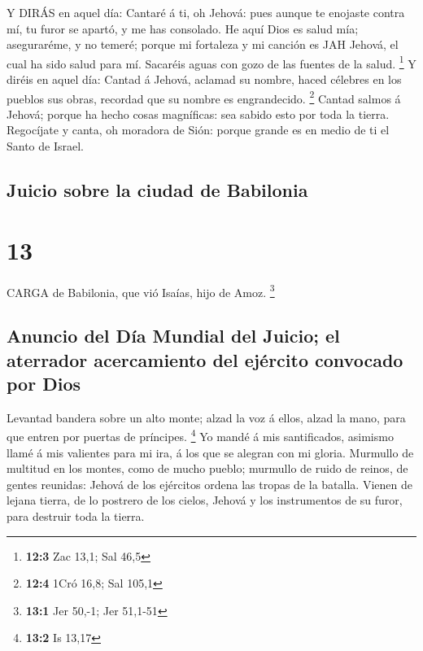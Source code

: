  Y DIRÁS en aquel día: Cantaré á ti, oh Jehová: pues aunque
te enojaste contra mí, tu furor se apartó, y me has consolado.
 He aquí Dios es salud mía; aseguraréme, y no temeré; porque
mi fortaleza y mi canción es JAH Jehová, el cual ha sido salud para mí.
 Sacaréis aguas con gozo de las fuentes de la salud.
\footnote{\textbf{12:3} Zac 13,1; Sal 46,5}  Y diréis en
aquel día: Cantad á Jehová, aclamad su nombre, haced célebres en los
pueblos sus obras, recordad que su nombre es engrandecido. \footnote{\textbf{12:4}
  1Cró 16,8; Sal 105,1}  Cantad salmos á Jehová; porque ha
hecho cosas magníficas: sea sabido esto por toda la tierra. 
Regocíjate y canta, oh moradora de Sión: porque grande es en medio de ti
el Santo de Israel.

\hypertarget{juicio-sobre-la-ciudad-de-babilonia}{%
\subsection{Juicio sobre la ciudad de
Babilonia}\label{juicio-sobre-la-ciudad-de-babilonia}}

\hypertarget{section-12}{%
\section{13}\label{section-12}}

 CARGA de Babilonia, que vió Isaías, hijo de Amoz.
\footnote{\textbf{13:1} Jer 50,-1; Jer 51,1-51}

\hypertarget{anuncio-del-duxeda-mundial-del-juicio-el-aterrador-acercamiento-del-ejuxe9rcito-convocado-por-dios}{%
\subsection{Anuncio del Día Mundial del Juicio; el aterrador
acercamiento del ejército convocado por
Dios}\label{anuncio-del-duxeda-mundial-del-juicio-el-aterrador-acercamiento-del-ejuxe9rcito-convocado-por-dios}}

 Levantad bandera sobre un alto monte; alzad la voz á ellos,
alzad la mano, para que entren por puertas de príncipes. \footnote{\textbf{13:2}
  Is 13,17}  Yo mandé á mis santificados, asimismo llamé á
mis valientes para mi ira, á los que se alegran con mi gloria.
 Murmullo de multitud en los montes, como de mucho pueblo;
murmullo de ruido de reinos, de gentes reunidas: Jehová de los ejércitos
ordena las tropas de la batalla.  Vienen de lejana tierra,
de lo postrero de los cielos, Jehová y los instrumentos de su furor,
para destruir toda la tierra.

